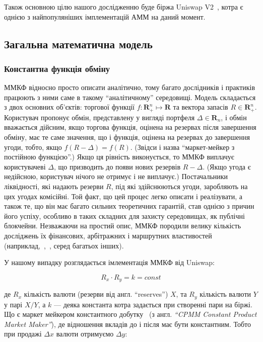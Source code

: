 \documentclass[14pt]{extarticle}
\begin{document}
Також основною цілю нашого дослідженню буде біржа Uniswap V2~\cite{adams2021uniswap},
котра є однією з найпопуляніших імплементацій АММ на даний момент.

\subsection{Загальна математична модель}\label{sec:math-model}

\subsubsection{Константна функція обміну}

ММКФ відносно просто описати аналітично, тому багато дослідників і практиків
працюють з ними саме в такому ``аналітичному'' середовищі. Модель складається з
двох основних об'єктів: торгової функції $f : \mathbf{R}_{+}^{n} \mapsto \mathbf{R}$
та вектора запасів $R \in \mathbf{R}^{n}_{+}$. Користувач пропонує обмін, представлену у
вигляді портфеля $\Delta \in \mathbf{R}_{n}$, і обмін вважається дійсним, якщо торгова функція,
оцінена на резервах після завершення обміну, має те саме значення, що і функція,
оцінена на резервах до завершення угоди, тобто, якщо $f(R - \Delta) = f(R)$. (Звідси
і назва ``маркет-мейкер з постійною функцією''.) Якщо ця рівність виконується,
то ММКФ виплачує користувачеві $\Delta$, що призводить до появи нових резервів
$R - \Delta$. (Якщо угода є недійсною, користувач нічого не отримує і не виплачує.)
Постачальники ліквідності, які надають резерви $R$, під які здійснюються угоди,
заробляють на цих угодах комісійні. Той факт, що цей процес легко описати і
реалізувати, а також те, що він має багато сильних теоретичних гарантій, став
однією з причин його успіху, особливо в таких складних для захисту середовищах,
як публічні блокчейни. Незважаючи на простий опис, ММКФ породили велику
кількість досліджень їх фінансових, арбітражних і маршрутних властивостей
(наприклад,~\cite{Angeris_2020},~\cite{danos}, серед багатьох інших).

У нашому випадку розглядається імлементація ММКФ від Uniswap:

\begin{equation}\label{eq:intro-swap}
	R_{x} \cdot R_{y} = k = const
\end{equation}

де \(R_{x}\) кількість валюти (резерви від англ. ``reserves'') \(X\), та
\(R_{y}\) кількість валюти \(Y\) у парі \(X/Y\), а \(k\) --- деяка константа котра
задається при створенні пари на біржі. Що є маркет мейкером константного
добутку~\cite{zhang2018formal} (з англ. \textit{``CPMM Constant Product Market
  Maker''}), де відношення вкладів до і після має бути константним. Тобто при
продажі $\Delta x$ валюти отримуємо $\Delta y$:
\end{document}
